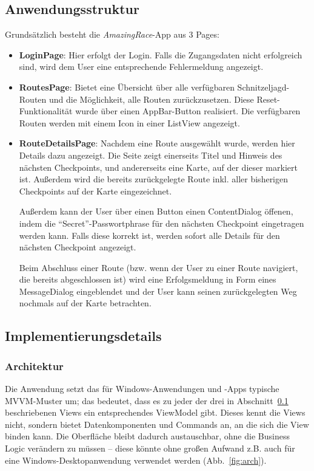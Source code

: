 \documentclass[a4paper,ngerman]{scrartcl}
\begin{document}
\subsection{Anwendungsstruktur}
\label{cha:Anwendungsstruktur}
Grundsätzlich besteht die \textit{AmazingRace}-App aus 3 Pages:
\begin{itemize}
	\item \textbf{LoginPage}: Hier erfolgt der Login. Falls die Zugangsdaten nicht erfolgreich sind, wird dem User eine entsprechende Fehlermeldung angezeigt.
	\item \textbf{RoutesPage}: Bietet eine Übersicht über alle verfügbaren Schnitzeljagd-Routen und die Möglichkeit, alle Routen zurückzusetzen. Diese Reset-Funktionalität wurde über einen AppBar-Button realisiert. Die verfügbaren Routen werden mit einem Icon in einer ListView angezeigt.
	\item \textbf{RouteDetailsPage}: Nachdem eine Route ausgewählt wurde, werden hier Details dazu angezeigt. Die Seite zeigt einerseits Titel und Hinweis des nächsten Checkpoints, und andererseits eine Karte, auf der dieser markiert ist. Außerdem wird die bereits zurückgelegte Route inkl. aller bisherigen Checkpoints auf der Karte eingezeichnet.
	
Außerdem kann der User über einen Button einen ContentDialog öffenen, indem die "`Secret"'-Passwortphrase für den nächsten Checkpoint eingetragen werden kann. Falls diese korrekt ist, werden sofort alle Details für den nächsten Checkpoint angezeigt.

Beim Abschluss einer Route (bzw. wenn der User zu einer Route navigiert, die bereits abgeschlossen ist) wird eine Erfolgsmeldung in Form eines MessageDialog eingeblendet und der User kann seinen zurückgelegten Weg nochmals auf der Karte betrachten.
\end{itemize}
\subsection{Implementierungsdetails}
\subsubsection{Architektur}
Die Anwendung setzt das für Windows-Anwendungen und -Apps typische MVVM-Muster um; das bedeutet, dass es zu jeder der drei in Abschnitt~\ref{cha:Anwendungsstruktur} beschriebenen Views ein entsprechendes ViewModel gibt. Dieses kennt die Views nicht, sondern bietet Datenkomponenten und Commands an, an die sich die View binden kann. Die Oberfläche bleibt dadurch austauschbar, ohne die Business Logic verändern zu müssen -- diese könnte ohne großen Aufwand z.B. auch für eine Windows-Desktopanwendung verwendet werden (Abb.~\ref{fig:arch}). 
\end{document}
